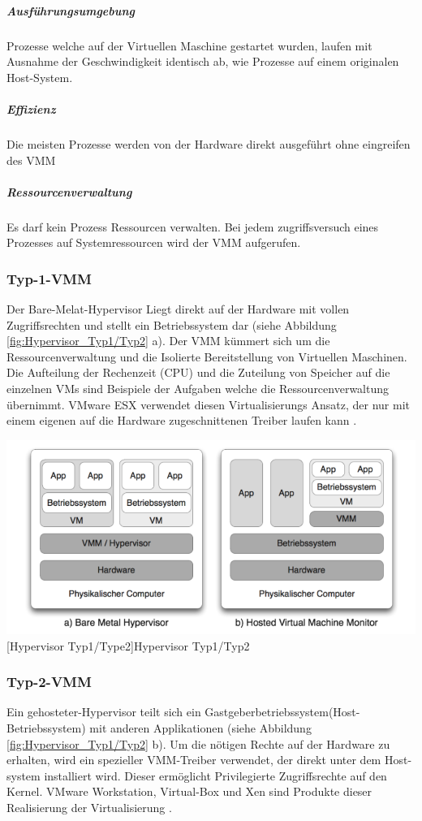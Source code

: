 \subparagraph{Ausführungsumgebung}
Prozesse welche auf der Virtuellen Maschine gestartet wurden, laufen mit Ausnahme der Geschwindigkeit identisch ab, wie Prozesse auf einem originalen Host-System.

\subparagraph{Effizienz}
Die meisten Prozesse werden von der Hardware direkt ausgeführt ohne eingreifen des VMM

\subparagraph{Ressourcenverwaltung}

Es darf kein Prozess Ressourcen verwalten. Bei jedem zugriffsversuch eines Prozesses auf Systemressourcen wird der VMM aufgerufen.

\subsubsection{Typ-1-VMM}
Der Bare-Melat-Hypervisor Liegt direkt auf der Hardware mit vollen Zugriffsrechten und stellt ein Betriebssystem dar (siehe Abbildung \ref{fig:Hypervisor_Typ1/Typ2} a). Der VMM kümmert sich um die Ressourcenverwaltung und die Isolierte Bereitstellung von Virtuellen Maschinen. Die Aufteilung der Rechenzeit (CPU) und die Zuteilung von Speicher auf die einzelnen VMs sind Beispiele der Aufgaben welche die Ressourcenverwaltung übernimmt. VMware ESX \cite{Go-to2018ESXi} verwendet diesen Virtualisierungs Ansatz, der nur mit einem eigenen auf die Hardware zugeschnittenen Treiber laufen kann \cite{Glatz2015Betriebssysteme}.

\vspace{1em}
\begin{minipage}{\linewidth}
	\centering
	\includegraphics[width=1\linewidth]{pics/Hypervisoren.PNG}
	[Hypervisor Typ1/Type2]{Hypervisor Typ1/Typ2 \cite{Meinel2011VirtualisierungMarktubersicht} }
	\label{fig:Hypervisor_Typ1/Typ2}
\end{minipage}

\subsubsection{Typ-2-VMM}
Ein gehosteter-Hypervisor teilt sich ein Gastgeberbetriebssystem(Host-Betriebssystem) mit anderen Applikationen (siehe Abbildung \ref{fig:Hypervisor_Typ1/Typ2} b). Um die nötigen Rechte auf der Hardware zu erhalten, wird ein spezieller VMM-Treiber verwendet, der direkt unter dem Host-system installiert wird. Dieser ermöglicht Privilegierte Zugriffsrechte auf den Kernel. VMware Workstation, Virtual-Box und Xen sind Produkte dieser Realisierung der Virtualisierung \cite{Glatz2015Betriebssysteme}.

